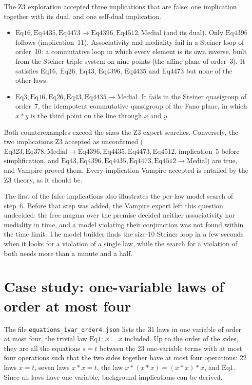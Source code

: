 \documentclass[11pt,a4paper]{article}
\theoremstyle{definition}
\theoremstyle{remark}
\newcommand{\code}[1]{\texttt{#1}}
\newcommand{\Eq}[1]{\mathrm{Eq}#1}
\begin{document}
The Z3 exploration accepted three implications that are false: one implication together with its dual, and one self-dual implication.
\begin{itemize}
  \item $\Eq{16}, \Eq{4435}, \Eq{4473} \to \Eq{4396}, \Eq{4512}, \text{Medial}$ (and its dual). Only $\Eq{4396}$ follows (implication~11). Associativity and mediality fail in a Steiner loop of order~10: a commutative loop in which every element is its own inverse, built from the Steiner triple system on nine points (the affine plane of order~3). It satisfies $\Eq{16}$, $\Eq{26}$, $\Eq{43}$, $\Eq{4396}$, $\Eq{4435}$ and $\Eq{4473}$ but none of the other laws.
  \item $\Eq{3}, \Eq{16}, \Eq{26}, \Eq{43}, \Eq{4435} \to \text{Medial}$. It fails in the Steiner quasigroup of order~7, the idempotent commutative quasigroup of the Fano plane, in which $x * y$ is the third point on the line through $x$ and $y$.
\end{itemize}
Both counterexamples exceed the sizes the Z3 expert searches. Conversely, the two implications Z3 accepted as unconfirmed ($\Eq{323}, \Eq{378}, \text{Medial} \to \Eq{4396}, \Eq{4435}, \Eq{4473}, \Eq{4512}$, implication~5 before simplification, and $\Eq{43}, \Eq{4396}, \Eq{4435}, \Eq{4473}, \Eq{4512} \to \text{Medial}$) are true, and Vampire proved them. Every implication Vampire accepted is entailed by the Z3 theory, as it should be.

The first of the false implications also illustrates the per-law model search of step~6. Before that step was added, the Vampire expert left this question undecided: the free magma over the premise decided neither associativity nor mediality in time, and a model violating their conjunction was not found within the time limit. The model builder finds the size-10 Steiner loop in a few seconds when it looks for a violation of a single law, while the search for a violation of both needs more than a minute and a half.

\section{Case study: one-variable laws of order at most four}\label{sec:case31}

The file \code{equations\_1var\_order4.json} lists the 31 laws in one variable of order at most four, the trivial law $\Eq{1}$: $x = x$ included. Up to the order of the sides, they are all the equations $s = t$ between the 23 one-variable terms with at most four operations such that the two sides together have at most four operations: 22 laws $x = t$, seven laws $x * x = t$, the law $x * (x * x) = (x * x) * x$, and $\Eq{1}$. Since all laws have one variable, background implications can be derived.
\end{document}
